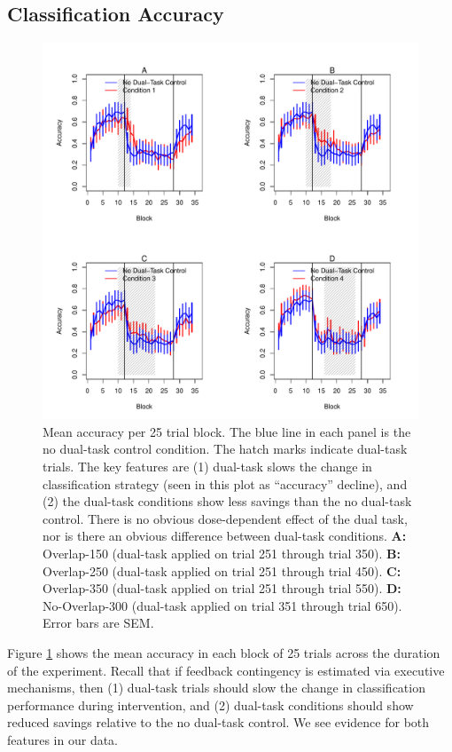 \documentclass[apacite,draftfirst,man]{apa6}
\begin{document}
\subsection*{Classification Accuracy}
\begin{figure}[t]
\centering \includegraphics[width=1.0\textwidth]{../figures/fig_learning_curves.pdf}
\caption{ Mean accuracy per 25 trial block. The blue line in each panel is
  the no dual-task control condition. The hatch marks indicate dual-task trials.
  The key features are (1) dual-task slows the change in classification strategy
  (seen in this plot as ``accuracy'' decline), and (2) the dual-task conditions
  show less savings than the no dual-task control. There is no obvious
  dose-dependent effect of the dual task, nor is there an obvious difference
  between dual-task conditions.
  \textbf{A:} Overlap-150 (dual-task applied on trial 251 through trial 350).
  \textbf{B:} Overlap-250 (dual-task applied on trial 251 through trial 450).
  \textbf{C:} Overlap-350 (dual-task applied on trial 251 through trial 550).
  \textbf{D:} No-Overlap-300 (dual-task applied on trial 351 through trial 650).
  Error bars are SEM. }
  \label{fig:learning_curves}
\end{figure}

Figure \ref{fig:learning_curves} shows the mean accuracy in each block of 25
trials across the duration of the experiment. Recall that if feedback
contingency is estimated via executive mechanisms, then (1) dual-task trials
should slow the change in classification performance during intervention, and
(2) dual-task conditions should show reduced savings relative to the no
dual-task control. We see evidence for both features in our data.
\end{document}
